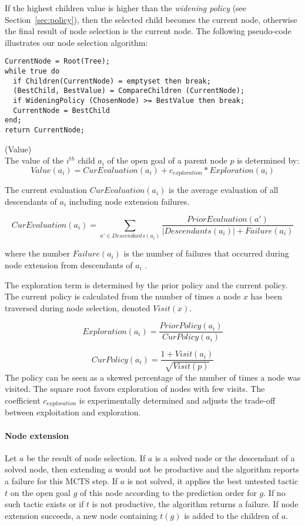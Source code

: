 \documentclass[runningheads,a4paper,draft]{svjour3}
\begin{document}
If the highest children value is higher than the \textit{widening policy} (see
Section~\ref{sec:policy}), then the
selected child
becomes the current node, otherwise the final result of node selection is the
current node. The following pseudo-code illustrates our node selection
algorithm:

\begin{lstlisting}[language=SMLSmall]
CurrentNode = Root(Tree);
while true do
  if Children(CurrentNode) = emptyset then break;
  (BestChild, BestValue) = CompareChildren (CurrentNode);
  if WideningPolicy (ChosenNode) >= BestValue then break;
  CurrentNode = BestChild
end;
return CurrentNode;
\end{lstlisting}

\begin{definition}\label{def:value}(Value)\\
The value of the $i^{th}$ child $a_i$ of the open goal of a parent node $p$
is determined by:
  \[\mathit{Value}(a_i) = \mathit{CurEvaluation}(a_i) + c_{\mathit{exploration}} *
\mathit{Exploration}(a_i)\]

The current evaluation $CurEvaluation(a_i)$ is the average evaluation of
all descendants of $a_i$ including node extension failures.

\[\mathit{CurEvaluation}(a_i) =
  \sum_{a' \in \mathit{Descendants}(a_i)} \frac{\mathit{PriorEvaluation}(a')}
  {|\mathit{Descendants}(a_i)| + \mathit{Failure}(a_i)}\]

where the number $\mathit{Failure}(a_i)$ is the number of failures that occurred
during node extension from descendants of $a_i$ .

The exploration term is determined by the prior policy and the current policy.
The current policy is calculated from the number of times a node $x$ has been
traversed during node selection, denoted $\mathit{Visit}(x)$.

\[\mathit{Exploration}(a_i) =
\frac{\mathit{PriorPolicy}(a_i)}{\mathit{CurPolicy}(a_i)}\]

\[\mathit{CurPolicy}(a_i) = \frac{1 +
\mathit{Visit}(a_i)}{\sqrt{\mathit{Visit}(p)}}\]
The policy can be seen as a skewed percentage of the number of times a node was
visited. The square root favors exploration of nodes with
  few visits. The coefficient $c_{\mathit{exploration}}$ is experimentally determined and
adjusts the trade-off between exploitation and exploration.
\end{definition}

\paragraph{Node extension}
Let $a$ be the result of node selection.
If $a$ is a solved node or the descendant of a solved node, then extending $a$
would not be productive and the algorithm reports a failure for this MCTS step.
If $a$ is not solved, it applies the best untested tactic $t$ on the open
goal $g$ of this
node according to the prediction order for $g$.
If no such tactic exists or if $t$ is not productive, the algorithm returns a
failure.
If node extension succeeds, a new node containing $t(g)$ is added to the
children of $a$.
\end{document}
